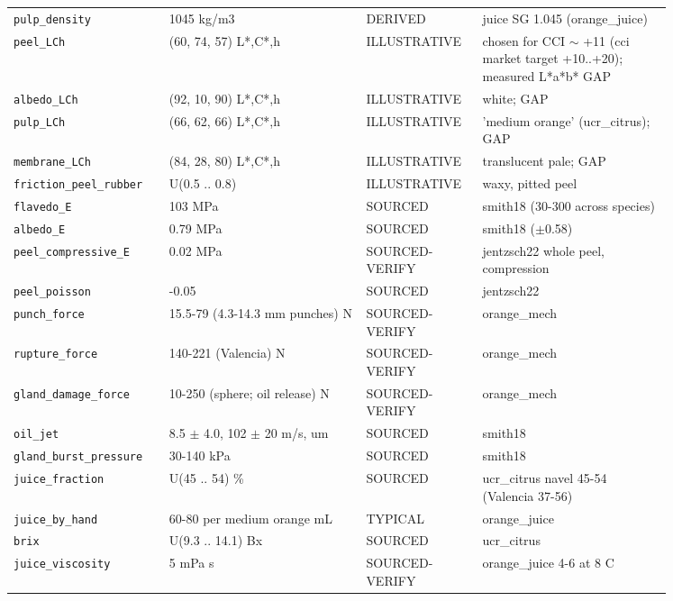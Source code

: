 \documentclass[10.5pt,a4paper]{article}
\begin{document}
{\begin{longtable}{@{}p{0.2\linewidth}p{0.27\linewidth}p{0.12\linewidth}p{0.26\linewidth}@{}}
\texttt{pulp\_\allowbreak{}density} & 1045 kg/m3 & DERIVED & juice SG 1.045 (orange\_juice) \\
\texttt{peel\_\allowbreak{}LCh} & (60, 74, 57) L*,C*,h & ILLUSTRATIVE & chosen for CCI $\sim$ +11 (cci market target +10..+20); measured L*a*b* GAP \\
\texttt{albedo\_\allowbreak{}LCh} & (92, 10, 90) L*,C*,h & ILLUSTRATIVE & white; GAP \\
\texttt{pulp\_\allowbreak{}LCh} & (66, 62, 66) L*,C*,h & ILLUSTRATIVE & 'medium orange' (ucr\_citrus); GAP \\
\texttt{membrane\_\allowbreak{}LCh} & (84, 28, 80) L*,C*,h & ILLUSTRATIVE & translucent pale; GAP \\
\texttt{friction\_\allowbreak{}peel\_\allowbreak{}rubber} & U(0.5 .. 0.8) & ILLUSTRATIVE & waxy, pitted peel \\
\texttt{flavedo\_\allowbreak{}E} & 103 MPa & SOURCED & smith18 (30-300 across species) \\
\texttt{albedo\_\allowbreak{}E} & 0.79 MPa & SOURCED & smith18 ($\pm$0.58) \\
\texttt{peel\_\allowbreak{}compressive\_\allowbreak{}E} & 0.02 MPa & SOURCED-VERIFY & jentzsch22 whole peel, compression \\
\texttt{peel\_\allowbreak{}poisson} & -0.05 & SOURCED & jentzsch22 \\
\texttt{punch\_\allowbreak{}force} & 15.5-79 (4.3-14.3 mm punches) N & SOURCED-VERIFY & orange\_mech \\
\texttt{rupture\_\allowbreak{}force} & 140-221 (Valencia) N & SOURCED-VERIFY & orange\_mech \\
\texttt{gland\_\allowbreak{}damage\_\allowbreak{}force} & 10-250 (sphere; oil release) N & SOURCED-VERIFY & orange\_mech \\
\texttt{oil\_\allowbreak{}jet} & 8.5 $\pm$ 4.0, 102 $\pm$ 20 m/s, um & SOURCED & smith18 \\
\texttt{gland\_\allowbreak{}burst\_\allowbreak{}pressure} & 30-140 kPa & SOURCED & smith18 \\
\texttt{juice\_\allowbreak{}fraction} & U(45 .. 54) \% & SOURCED & ucr\_citrus navel 45-54 (Valencia 37-56) \\
\texttt{juice\_\allowbreak{}by\_\allowbreak{}hand} & 60-80 per medium orange mL & TYPICAL & orange\_juice \\
\texttt{brix} & U(9.3 .. 14.1) Bx & SOURCED & ucr\_citrus \\
\texttt{juice\_\allowbreak{}viscosity} & 5 mPa s & SOURCED-VERIFY & orange\_juice 4-6 at 8 C \\

\end{longtable}}
\end{document}
